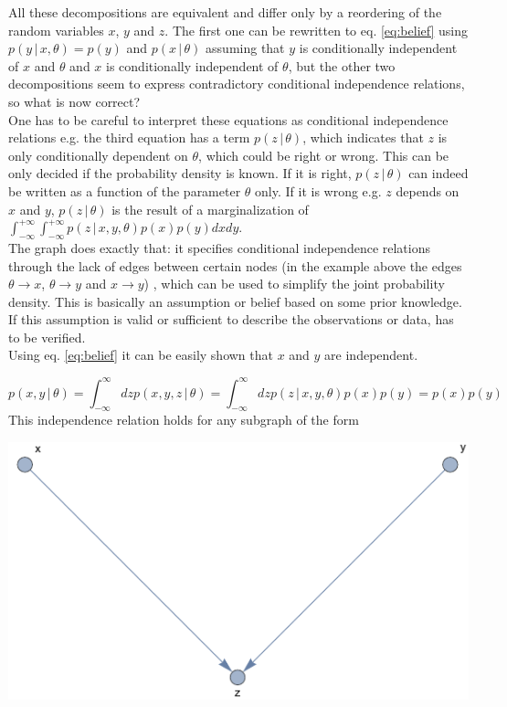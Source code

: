 \documentclass{tstextbook}
\begin{document}
All these decompositions are equivalent and differ only by a reordering of the random variables $x$, $y$ and $z$. The first one can be rewritten to eq. \ref{eq:belief} using $p(y\,\vert\, x,\theta)=p(y)$ and $p(x\,\vert\, \theta)$ assuming that $y$ is conditionally independent of $x$ and $\theta$ and $x$ is conditionally independent of $\theta$, but the other two decompositions seem to express contradictory conditional independence relations, so what is now correct?\\

One has to be careful to interpret these equations as conditional independence relations e.g. the third equation has a term $p(z\,\vert\, \theta)$, which indicates that $z$ is only conditionally dependent on $\theta$, which could be right or wrong. This can be only decided if the probability density is known. If it is right, $p(z\,\vert\, \theta)$ can indeed be written as a function of the parameter $\theta$ only. If it is wrong e.g. $z$ depends on $x$ and $y$, $p(z\,\vert\, \theta)$ is the result of a marginalization of $\int_{-\infty}^{+\infty}\int_{-\infty}^{+\infty}p(z\,\vert\, x,y,\theta)p(x)p(y)dxdy$.\\

The graph does exactly that: it specifies conditional independence relations through the lack of edges between certain nodes (in the example above the edges $\theta\rightarrow x$, $\theta\rightarrow y$ and $x\rightarrow y$) , which can be used to simplify the joint probability density. This is basically an assumption or belief based on some prior knowledge. If this assumption is valid or sufficient to describe the observations or data, has to be verified.\\
 
Using eq. \ref{eq:belief} it can be easily shown that $x$ and $y$ are independent.

\begin{equation}
p(x,y\,\vert\,\theta)=\int_{-\infty}^{\infty}dz p(x,y,z\,\vert\,\theta)=\int_{-\infty}^{\infty}dz p(z\,\vert\, x,y,\theta)p(x)p(y) = p(x)p(y)
\end{equation}
This independence relation holds for any subgraph of the form

 \includegraphics[scale=0.7, center]{images/v_structure.pdf}
\end{document}
